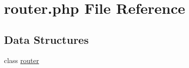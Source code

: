 \hypertarget{router_8php}{
\section{router.php File Reference}
\label{router_8php}
}
\subsection*{Data Structures}
\begin{DoxyCompactItemize}
\item 
class \hyperlink{classrouter}{router}
\end{DoxyCompactItemize}
